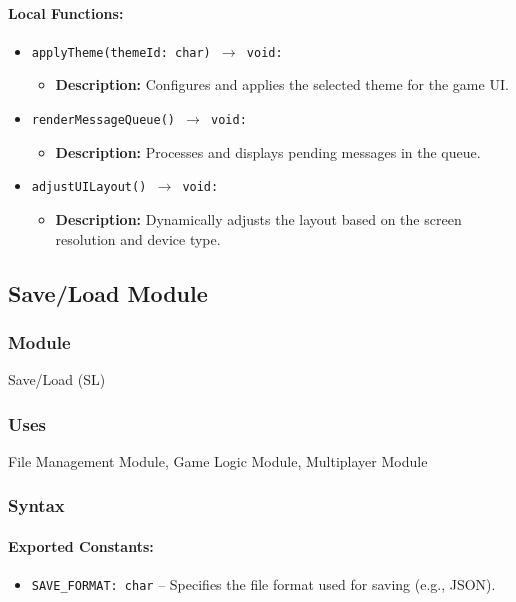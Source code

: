 \documentclass[12pt, titlepage]{article}
\begin{document}
\paragraph{Local Functions:}
\begin{itemize}
    \item \texttt{applyTheme(themeId: char) $\to$ void:}
    \begin{itemize}
        \item \textbf{Description:} Configures and applies the selected theme for the game UI.
    \end{itemize}
    \item \texttt{renderMessageQueue() $\to$ void:}
    \begin{itemize}
        \item \textbf{Description:} Processes and displays pending messages in the queue.
    \end{itemize}
    \item \texttt{adjustUILayout() $\to$ void:}
    \begin{itemize}
        \item \textbf{Description:} Dynamically adjusts the layout based on the screen resolution and device type.
    \end{itemize}
\end{itemize}

\newpage

\subsection{Save/Load Module}

\subsubsection{Module}
Save/Load (SL)

\subsubsection{Uses}
File Management Module, Game Logic Module, Multiplayer Module

\subsubsection{Syntax}

\paragraph{Exported Constants:}
\begin{itemize}
    \item \texttt{SAVE\_FORMAT: char} -- Specifies the file format used for saving (e.g., JSON).
\end{itemize}
\end{document}
